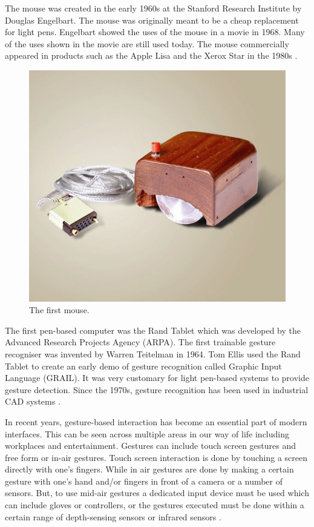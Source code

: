 \documentclass{article}
\begin{document}
The mouse was created in the early 1960s at the Stanford Research Institute by Douglas Engelbart. The mouse was originally meant to be a cheap replacement for light pens. Engelbart showed the uses of the mouse in a movie in 1968. Many of the uses shown in the movie are still used today. The mouse commercially appeared in products such as the Apple Lisa and the Xerox Star in the 1980s \cite{10.1145/274430.274436}.

\begin{figure}[H]
	\centering
	\includegraphics[width=0.45\linewidth]{images/the-first-mouse.jpeg}
	\caption{The first mouse.}
	\label{fig:The first mouse.}
\end{figure}

The first pen-based computer was the Rand Tablet which was developed by the Advanced Research Projects Agency (ARPA). The first trainable gesture recogniser was invented by Warren Teitelman in 1964. Tom Ellis used the Rand Tablet to create an early demo of gesture recognition called Graphic Input Language (GRAIL). It was very customary for light pen-based systems to provide gesture detection. Since the 1970s, gesture recognition has been used in industrial CAD systems \cite{10.1145/274430.274436}.

In recent years, gesture-based interaction has become an essential part of modern interfaces. This can be seen across multiple areas in our way of life including workplaces and entertainment. Gestures can include touch screen gestures and free form or in-air gestures. Touch screen interaction is done by touching a screen directly with one's fingers. While in air gestures are done by making a certain gesture with one's hand and/or fingers in front of a camera or a number of sensors. But, to use mid-air gestures a dedicated input device must be used which can include gloves or controllers, or the gestures executed must be done within a certain range of depth-sensing sensors or infrared sensors \cite{doi:10.1177/0018720818824253}.
\end{document}
